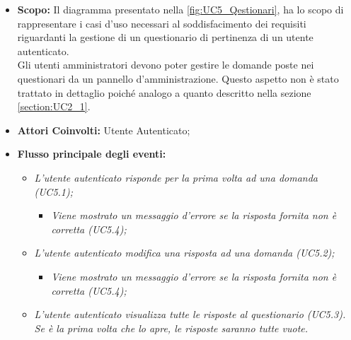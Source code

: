 			\begin{itemize}
				\item \textbf{Scopo:} Il diagramma presentato nella \autoref{fig:UC5_Qestionari}, ha lo scopo di rappresentare i casi d'uso necessari al soddisfacimento dei requisiti riguardanti la gestione di un questionario di pertinenza di un utente autenticato. \\ 
				Gli utenti amministratori devono poter gestire le domande poste nei questionari da un pannello d'amministrazione. Questo aspetto non è stato trattato in dettaglio poiché analogo a quanto descritto nella sezione \ref{section:UC2_1}.
				\item \textbf{Attori Coinvolti:} Utente Autenticato;
				\item \textbf{Flusso principale degli eventi:} 
				\begin{itemize}
					\item \textit{L'utente autenticato risponde per la prima volta ad una domanda (UC5.1);}
					\begin{itemize}
						\item \textit{Viene mostrato un messaggio d'errore se la risposta fornita non è corretta (UC5.4);}
					\end{itemize}
					\item \textit{L'utente autenticato modifica una risposta ad una domanda (UC5.2);}
					\begin{itemize}
						\item \textit{Viene mostrato un messaggio d'errore se la risposta fornita non è corretta (UC5.4);}
					\end{itemize}
					\item \textit{L'utente autenticato visualizza tutte le risposte al questionario (UC5.3). Se è la prima volta che lo apre, le risposte saranno tutte vuote.}
				\end{itemize}
			\end{itemize}
	
	\newpage		
